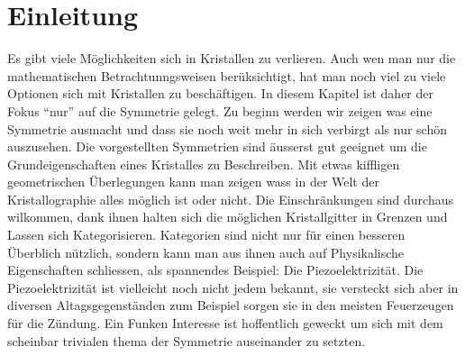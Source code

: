 \section{Einleitung}
Es gibt viele Möglichkeiten sich in Kristallen zu verlieren.
Auch wen man nur die mathematischen Betrachtunngsweisen berüksichtigt, hat man noch viel zu viele Optionen sich mit Kristallen zu beschäftigen.
In diesem Kapitel ist daher der Fokus ``nur'' auf die Symmetrie gelegt.
Zu beginn werden wir zeigen was eine Symmetrie ausmacht und dass sie noch weit mehr in sich verbirgt als nur schön auszusehen.
Die vorgestellten Symmetrien sind äusserst gut geeignet um die Grundeigenschaften eines Kristalles zu Beschreiben.
Mit etwas kiffligen geometrischen Überlegungen kann man zeigen wass in der Welt der Kristallographie alles möglich ist oder nicht.
Die Einschränkungen sind durchaus wilkommen, dank ihnen halten sich die möglichen Kristallgitter in Grenzen und Lassen sich Kategorisieren.
Kategorien sind nicht nur für einen besseren Überblich nützlich, sondern kann man aus ihnen auch auf Physikalische Eigenschaften schliessen, als spannendes Beispiel: Die Piezoelektrizität.
Die Piezoelektrizität ist vielleicht noch nicht jedem bekannt, sie versteckt sich aber in diversen Altagsgegenständen zum Beispiel sorgen sie in den meisten Feuerzeugen für die Zündung.
Ein Funken Interesse ist hoffentlich geweckt um sich mit dem scheinbar trivialen thema der Symmetrie auseinander zu setzten.



